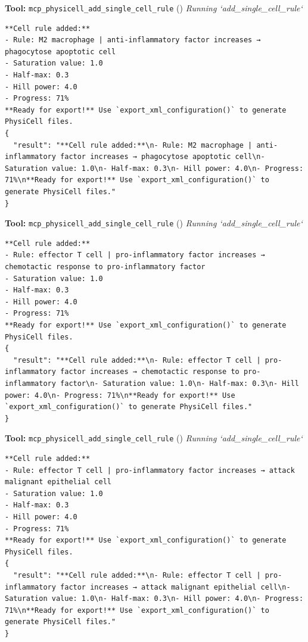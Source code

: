 \documentclass[11pt,a4paper]{article}
\begin{document}
\begin{toolokbox}
\textbf{Tool:} \texttt{mcp\_physicell\_add\_single\_cell\_rule} (\checkmark)
\textit{Running `add\_single\_cell\_rule`}
\begin{lstlisting}
**Cell rule added:**
- Rule: M2 macrophage | anti-inflammatory factor increases → phagocytose apoptotic cell
- Saturation value: 1.0
- Half-max: 0.3
- Hill power: 4.0
- Progress: 71%
**Ready for export!** Use `export_xml_configuration()` to generate PhysiCell files.
{
  "result": "**Cell rule added:**\n- Rule: M2 macrophage | anti-inflammatory factor increases → phagocytose apoptotic cell\n- Saturation value: 1.0\n- Half-max: 0.3\n- Hill power: 4.0\n- Progress: 71%\n**Ready for export!** Use `export_xml_configuration()` to generate PhysiCell files."
}
\end{lstlisting}
\end{toolokbox}
\begin{toolokbox}
\textbf{Tool:} \texttt{mcp\_physicell\_add\_single\_cell\_rule} (\checkmark)
\textit{Running `add\_single\_cell\_rule`}
\begin{lstlisting}
**Cell rule added:**
- Rule: effector T cell | pro-inflammatory factor increases → chemotactic response to pro-inflammatory factor
- Saturation value: 1.0
- Half-max: 0.3
- Hill power: 4.0
- Progress: 71%
**Ready for export!** Use `export_xml_configuration()` to generate PhysiCell files.
{
  "result": "**Cell rule added:**\n- Rule: effector T cell | pro-inflammatory factor increases → chemotactic response to pro-inflammatory factor\n- Saturation value: 1.0\n- Half-max: 0.3\n- Hill power: 4.0\n- Progress: 71%\n**Ready for export!** Use `export_xml_configuration()` to generate PhysiCell files."
}
\end{lstlisting}
\end{toolokbox}
\begin{toolokbox}
\textbf{Tool:} \texttt{mcp\_physicell\_add\_single\_cell\_rule} (\checkmark)
\textit{Running `add\_single\_cell\_rule`}
\begin{lstlisting}
**Cell rule added:**
- Rule: effector T cell | pro-inflammatory factor increases → attack malignant epithelial cell
- Saturation value: 1.0
- Half-max: 0.3
- Hill power: 4.0
- Progress: 71%
**Ready for export!** Use `export_xml_configuration()` to generate PhysiCell files.
{
  "result": "**Cell rule added:**\n- Rule: effector T cell | pro-inflammatory factor increases → attack malignant epithelial cell\n- Saturation value: 1.0\n- Half-max: 0.3\n- Hill power: 4.0\n- Progress: 71%\n**Ready for export!** Use `export_xml_configuration()` to generate PhysiCell files."
}
\end{lstlisting}
\end{toolokbox}
\end{document}
